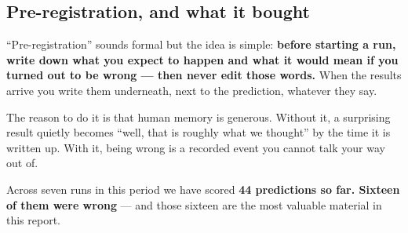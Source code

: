 \documentclass[11pt]{article}
\begin{document}
\subsection{Pre-registration, and what it bought}

``Pre-registration'' sounds formal but the idea is simple: \textbf{before starting a run, write down
what you expect to happen and what it would mean if you turned out to be wrong --- then never edit those
words.} When the results arrive you write them underneath, next to the prediction, whatever they say.

The reason to do it is that human memory is generous. Without it, a surprising result quietly becomes
``well, that is roughly what we thought'' by the time it is written up. With it, being wrong is a
recorded event you cannot talk your way out of.

Across seven runs in this period we have scored \textbf{44 predictions so far. Sixteen of them were
wrong} --- and those sixteen are the most valuable material in this report.
\end{document}
